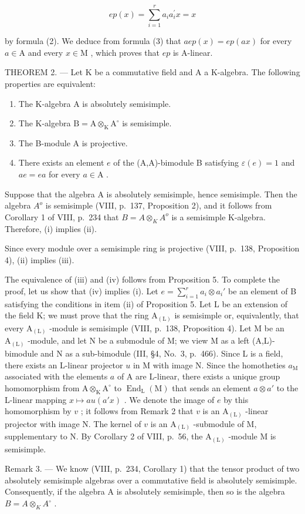 \[
e p (x) = \sum_ {i = 1} ^ {r} a _ {i} a _ {i} ^ {\prime} x = x
\]

by formula (2). We deduce from formula (3) that \(aep(x) = ep(ax)\) for every \(a \in \mathrm{A}\) and every \(x \in \mathrm{M}\) , which proves that \(ep\) is A-linear.

THEOREM 2. --- Let K be a commutative field and A a K-algebra. The following properties are equivalent:

\begin{enumerate}
\def\labelenumi{(\roman{enumi})}
\item
  The K-algebra A is absolutely semisimple.
\item
  The K-algebra \(\mathrm{B} = \mathrm{A}\otimes_{\mathrm{K}}\mathrm{A}^{\circ}\) is semisimple.
\item
  The B-module A is projective.
\item
  There exists an element \(e\) of the (A,A)-bimodule B satisfying \(\varepsilon(e) = 1\) and \(ae = ea\) for every \(a \in \mathrm{A}\) .
\end{enumerate}

Suppose that the algebra A is absolutely semisimple, hence semisimple. Then the algebra \(A^{o}\) is semisimple (VIII, p.~137, Proposition 2), and it follows from Corollary 1 of VIII, p.~234 that \(B = A \otimes_{K} A^{o}\) is a semisimple K-algebra. Therefore, (i) implies (ii).

Since every module over a semisimple ring is projective (VIII, p.~138, Proposition 4), (ii) implies (iii).

The equivalence of (iii) and (iv) follows from Proposition 5. To complete the proof, let us show that (iv) implies (i). Let \(e = \sum_{i=1}^{r} a_i \otimes a_i'\) be an element of B satisfying the conditions in item (ii) of Proposition 5. Let L be an extension of the field K; we must prove that the ring \(\mathrm{A}_{(\mathrm{L})}\) is semisimple or, equivalently, that every \(\mathrm{A}_{(\mathrm{L})}\) -module is semisimple (VIII, p.~138, Proposition 4). Let M be an \(\mathrm{A}_{(\mathrm{L})}\) -module, and let N be a submodule of M; we view M as a left (A,L)-bimodule and N as a sub-bimodule (III, §4, No.~3, p.~466). Since L is a field, there exists an L-linear projector \(u\) in M with image N. Since the homotheties \(a_{\mathrm{M}}\) associated with the elements \(a\) of A are L-linear, there exists a unique group homomorphism from \(\mathrm{A} \otimes_{\mathrm{K}} \mathrm{A}^{\circ}\) to \(\operatorname{End}_{\mathrm{L}}(\mathrm{M})\) that sends an element \(a \otimes a'\) to the L-linear mapping \(x \mapsto au(a'x)\) . We denote the image of \(e\) by this homomorphism by \(v\) ; it follows from Remark 2 that \(v\) is an \(\mathrm{A}_{(\mathrm{L})}\) -linear projector with image N. The kernel of \(v\) is an \(\mathrm{A}_{(\mathrm{L})}\) -submodule of M, supplementary to N. By Corollary 2 of VIII, p.~56, the \(\mathrm{A}_{(\mathrm{L})}\) -module M is semisimple.

Remark 3. --- We know (VIII, p.~234, Corollary 1) that the tensor product of two absolutely semisimple algebras over a commutative field is absolutely semisimple. Consequently, if the algebra A is absolutely semisimple, then so is the algebra \(B = A \otimes_{K} A^{\circ}\) .

